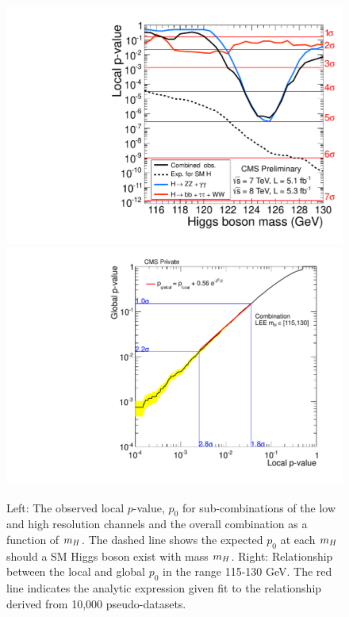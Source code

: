 \begin{figure}[hbt!]
\begin{center}
\includegraphics[width=.49\textwidth]{combinations/ichep2012/sqr_pvala_all_byresol.pdf}
\includegraphics[width=.49\textwidth]{combinations/ichep2012/lee-combination-115-130.pdf}
\caption{Left: The observed local $p$-value, $p_{0}$ for sub-combinations of the low and
high resolution channels and the overall combination as a function of $m_{H}$. The dashed
line shows the expected $p_{0}$ at each $m_{H}$ should a SM Higgs boson exist with mass $m_{H}$.
Right: Relationship between the local and global $p_{0}$ in the range 115-130 GeV.
The red line indicates the analytic expression given fit to the relationship derived from
10,000 pseudo-datasets.}
\label{fig:combinedpval}
\end{center}
\end{figure}
